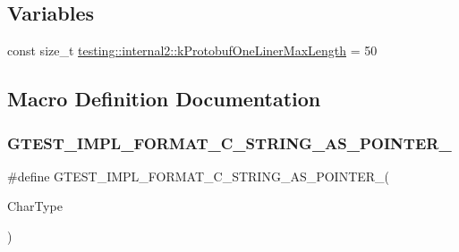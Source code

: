 \subsection*{Variables}
\begin{DoxyCompactItemize}
\item 
const size\+\_\+t \mbox{\hyperlink{namespacetesting_1_1internal2_a140c8efd51e63a3def98445bff107518}{testing\+::internal2\+::k\+Protobuf\+One\+Liner\+Max\+Length}} = 50
\end{DoxyCompactItemize}


\subsection{Macro Definition Documentation}
\mbox{\label{googletest-master_2googletest_2include_2gtest_2gtest-printers_8h_a79d4724b4bc2a1dd8493c366b5ca626a}} 
\subsubsection{\texorpdfstring{GTEST\_IMPL\_FORMAT\_C\_STRING\_AS\_POINTER\_}{GTEST\_IMPL\_FORMAT\_C\_STRING\_AS\_POINTER\_}}
{\footnotesize\ttfamily \#define G\+T\+E\+S\+T\+\_\+\+I\+M\+P\+L\+\_\+\+F\+O\+R\+M\+A\+T\+\_\+\+C\+\_\+\+S\+T\+R\+I\+N\+G\+\_\+\+A\+S\+\_\+\+P\+O\+I\+N\+T\+E\+R\+\_\+(\begin{DoxyParamCaption}\item[{}]{Char\+Type }\end{DoxyParamCaption})}

